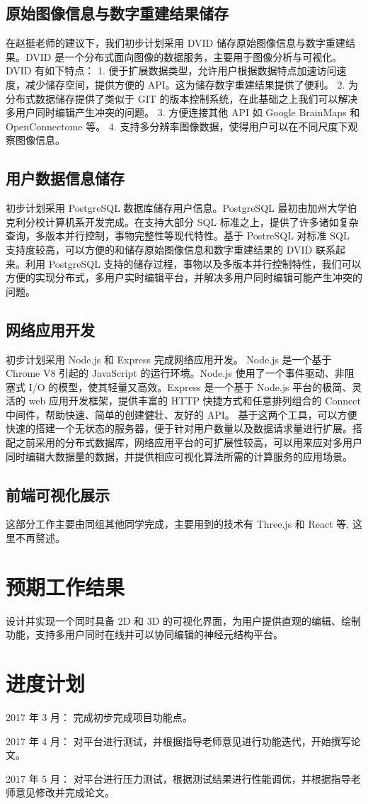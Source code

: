 {\subsection{原始图像信息与数字重建结果储存}
在赵挺老师的建议下，我们初步计划采用 DVID 储存原始图像信息与数字重建结果。DVID 是一个分布式面向图像的数据服务，主要用于图像分析与可视化。DVID 有如下特点：
1. 便于扩展数据类型，允许用户根据数据特点加速访问速度，减少储存空间，提供方便的 API。这为储存数字重建结果提供了便利。
2. 为分布式数据储存提供了类似于 GIT 的版本控制系统，在此基础之上我们可以解决多用户同时编辑产生冲突的问题。
3. 方便连接其他 API 如 Google BrainMaps 和 OpenConnectome 等。
4. 支持多分辨率图像数据，使得用户可以在不同尺度下观察图像信息。

\subsection{用户数据信息储存}
初步计划采用 PostgreSQL 数据库储存用户信息。PostgreSQL 最初由加州大学伯克利分校计算机系开发完成。在支持大部分 SQL 标准之上，提供了许多诸如复杂查询，多版本并行控制，事物完整性等现代特性。基于 PostreSQL 对标准 SQL 支持度较高，可以方便的和储存原始图像信息和数字重建结果的 DVID 联系起来。利用 PostgreSQL 支持的储存过程，事物以及多版本并行控制特性，我们可以方便的实现分布式，多用户实时编辑平台，并解决多用户同时编辑可能产生冲突的问题。

\subsection{网络应用开发}
初步计划采用 Node.js 和 Express 完成网络应用开发。
Node.js 是一个基于 Chrome V8 引起的 JavaScript 的运行环境。Node.js 使用了一个事件驱动、非阻塞式 I/O 的模型，使其轻量又高效。Express 是一个基于 Node.js 平台的极简、灵活的 web 应用开发框架，提供丰富的 HTTP 快捷方式和任意排列组合的 Connect 中间件，帮助快速、简单的创建健壮、友好的 API。
基于这两个工具，可以方便快速的搭建一个无状态的服务器，便于针对用户数量以及数据请求量进行扩展。搭配之前采用的分布式数据库，网络应用平台的可扩展性较高，可以用来应对多用户同时编辑大数据量的数据，并提供相应可视化算法所需的计算服务的应用场景。

\subsection{前端可视化展示}
这部分工作主要由同组其他同学完成，主要用到的技术有 Three.js 和 React 等, 这里不再赘述。 

\section{预期工作结果}
设计并实现一个同时具备 2D 和 3D 的可视化界面，为用户提供直观的编辑、绘制功能，支持多用户同时在线并可以协同编辑的神经元结构平台。

\section{进度计划}
2017 年 3 月： 完成初步完成项目功能点。

2017 年 4 月： 对平台进行测试，并根据指导老师意见进行功能迭代，开始撰写论文。

2017 年 5 月： 对平台进行压力测试，根据测试结果进行性能调优，并根据指导老师意见修改并完成论文。

}